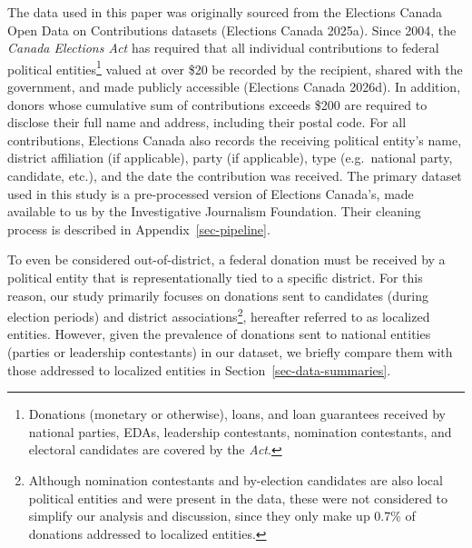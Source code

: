 \documentclass[
  letterpaper,
  DIV=11,
  numbers=noendperiod]{scrartcl}
\begin{document}
The data used in this paper was originally sourced from the Elections
Canada Open Data on Contributions datasets (Elections Canada 2025a).
Since 2004, the \emph{Canada Elections Act} has required that all
individual contributions to federal political entities\footnote{Donations
  (monetary or otherwise), loans, and loan guarantees received by
  national parties, EDAs, leadership contestants, nomination
  contestants, and electoral candidates are covered by the \emph{Act}.}
valued at over \$20 be recorded by the recipient, shared with the
government, and made publicly accessible (Elections Canada 2026d). In
addition, donors whose cumulative sum of contributions exceeds \$200 are
required to disclose their full name and address, including their postal
code. For all contributions, Elections Canada also records the receiving
political entity's name, district affiliation (if applicable), party (if
applicable), type (e.g.~national party, candidate, etc.), and the date
the contribution was received. The primary dataset used in this study is
a pre-processed version of Elections Canada's, made available to us by
the Investigative Journalism Foundation. Their cleaning process is
described in Appendix~\ref{sec-pipeline}.

To even be considered out-of-district, a federal donation must be
received by a political entity that is representationally tied to a
specific district. For this reason, our study primarily focuses on
donations sent to candidates (during election periods) and district
associations\footnote{Although nomination contestants and by-election
  candidates are also local political entities and were present in the
  data, these were not considered to simplify our analysis and
  discussion, since they only make up 0.7\% of donations addressed to
  localized entities.}, hereafter referred to as localized entities.
However, given the prevalence of donations sent to national entities
(parties or leadership contestants) in our dataset, we briefly compare
them with those addressed to localized entities in
Section~\ref{sec-data-summaries}.
\end{document}
